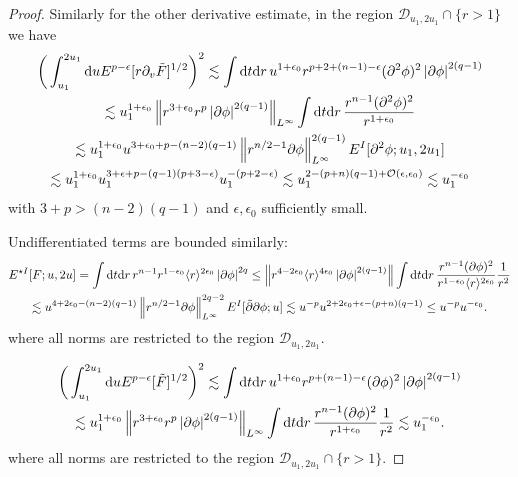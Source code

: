 \documentclass[11pt, oneside]{amsart}
\begin{document}
\begin{proof}
		Similarly for the other derivative estimate, in the region ${\mathcal{D}_{u_1,2u_1}}\cap\{r>1\}$ we have
		\begin{equation*}
			\begin{gathered}
				\bigg(\int_{u_1}^{2u_1}\mathrm{d} u E^{p-\epsilon}[r\partial_v\tilde{F}]^{1/2}\bigg)^2\lesssim\int\mathrm{d} t\mathrm{d} r\,u^{1+\epsilon_0}r^{p+2+(n-1)-\epsilon}(\partial^2\phi)^2\left\lvert \partial\phi\right\rvert^{2(q-1)}\\
				\lesssim u_1^{1+\epsilon_0}\left\lVert r^{3+\epsilon_0}r^p\left\lvert \partial\phi\right\rvert^{2(q-1)}\right\rVert_{L^\infty}\int\mathrm{d} t\mathrm{d} r\,\frac{r^{n-1}(\partial^2\phi)^2}{r^{1+\epsilon_0}}\\
				\lesssim  u_1^{1+\epsilon_0}u^{3+\epsilon_0+p-(n-2)(q-1)}\left\lVert r^{n/2-1}\partial\phi\right\rVert^{2(q-1)}_{L^\infty}E^{I}[\partial^2\phi;u_1,2u_1]\\
				\lesssim u_1^{1+\epsilon_0}u_1^{3+\epsilon+p-(q-1)(p+3-\epsilon)}u_1^{-(p+2-\epsilon)}
				\lesssim u_1^{2-(p+n)(q-1)+\mathcal{O}(\epsilon,\epsilon_0)}\lesssim u_1^{-\epsilon_0}
			\end{gathered}
		\end{equation*}
		with $3+p>(n-2)(q-1)$ and $\epsilon,\epsilon_0$ sufficiently small. 
		
		Undifferentiated terms are bounded similarly:
		\begin{equation*}
			\begin{gathered}
				E^{\star I}[F;u,2u]=\int\mathrm{d} t\mathrm{d} r\, r^{n-1} r^{1-\epsilon_0}\langle r \rangle^{2\epsilon_0}\left\lvert \partial\phi\right\rvert^{2q}\leq\left\lVert r^{4-2\epsilon_0}\langle r \rangle^{4\epsilon_0}\left\lvert \partial\phi\right\rvert^{2(q-1)}\right\rVert\int\mathrm{d} t\mathrm{d} r\, \frac{r^{n-1}(\partial\phi)^2}{r^{1-\epsilon_0}\langle r \rangle^{2\epsilon_0}}\frac{1}{r^2}\\
				\lesssim u^{4+2\epsilon_0-(n-2)(q-1)}\left\lVert r^{n/2-1}\partial\phi\right\rVert^{2q-2}_{L^\infty}E^I[\tilde{\partial}\partial\phi;u]\lesssim u^{-p}u^{2+2\epsilon_0+\epsilon-(p+n)(q-1)}\leq u^{-p}u^{-\epsilon_0}.
			\end{gathered}
		\end{equation*}
		where all norms are restricted to the region ${\mathcal{D}_{u_1,2u_1}}$.
		
		\begin{equation*}
			\begin{gathered}
				\bigg(\int_{u_1}^{2u_1}\mathrm{d} u E^{p-\epsilon}[\tilde{F}]^{1/2}\bigg)^2\lesssim\int\mathrm{d} t\mathrm{d} r\,u^{1+\epsilon_0}r^{p+(n-1)-\epsilon}(\partial\phi)^2\left\lvert \partial\phi\right\rvert^{2(q-1)}\\
				\lesssim u_1^{1+\epsilon_0}\left\lVert r^{3+\epsilon_0}r^p\left\lvert \partial\phi\right\rvert^{2(q-1)}\right\rVert_{L^\infty}\int\mathrm{d} t\mathrm{d} r\,\frac{r^{n-1}(\partial\phi)^2}{r^{1+\epsilon_0}}\frac{1}{r^2}\lesssim u_1^{-\epsilon_0}.
			\end{gathered}
		\end{equation*}
		where all norms are restricted to the region ${\mathcal{D}_{u_1,2u_1}}\cap\{r>1\}$.
	\end{proof}
	
\end{document}
